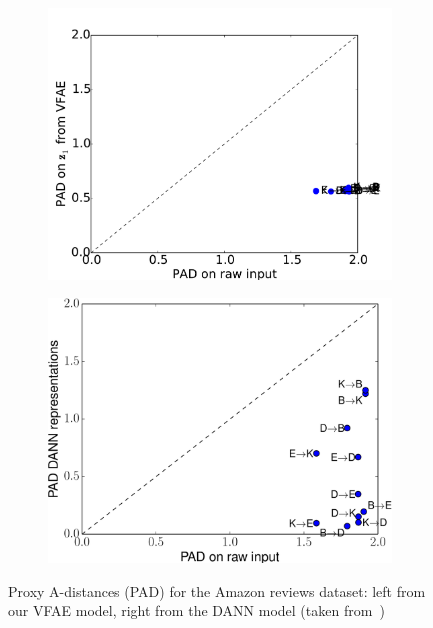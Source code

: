 \documentclass{article} %
\begin{document}
\begin{figure}[ht]
    \centering
    \begin{subfigure}{.49\textwidth}
    \centering
        \includegraphics[width=1.\textwidth]{pad_vfae_x_reviews.pdf}
  \end{subfigure} %
    \begin{subfigure}{.49\textwidth}
      \centering
        \includegraphics[width=.9\textwidth]{PAD_DANN.pdf}
     \end{subfigure} %
    \caption{Proxy A-distances (PAD) for the Amazon reviews dataset: left from our VFAE model, right from the DANN model (taken from~\cite{2015arXiv150507818G})}
    \label{fig:pad_reviews}
\end{figure}
\end{document}
